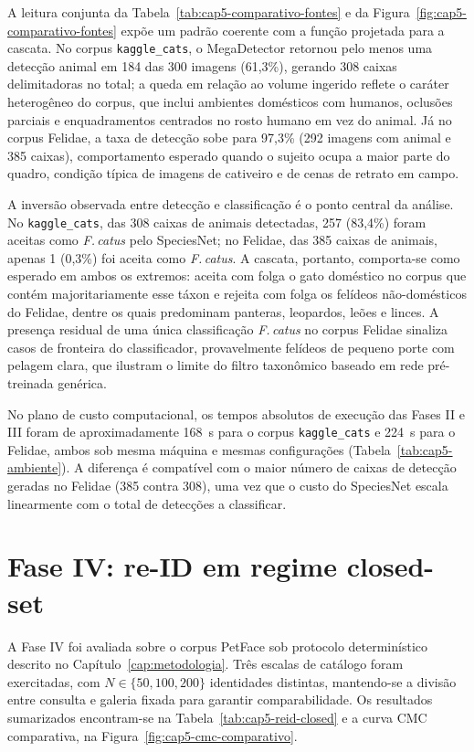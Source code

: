 A leitura conjunta da Tabela~\ref{tab:cap5-comparativo-fontes} e da Figura~\ref{fig:cap5-comparativo-fontes} expõe um padrão coerente com a função projetada para a cascata. No corpus \texttt{kaggle\_cats}, o MegaDetector retornou pelo menos uma detecção animal em 184 das 300 imagens (61,3\%), gerando 308 caixas delimitadoras no total; a queda em relação ao volume ingerido reflete o caráter heterogêneo do corpus, que inclui ambientes domésticos com humanos, oclusões parciais e enquadramentos centrados no rosto humano em vez do animal. Já no corpus Felidae, a taxa de detecção sobe para 97,3\% (292 imagens com animal e 385 caixas), comportamento esperado quando o sujeito ocupa a maior parte do quadro, condição típica de imagens de cativeiro e de cenas de retrato em campo.

A inversão observada entre detecção e classificação é o ponto central da análise. No \texttt{kaggle\_cats}, das 308 caixas de animais detectadas, 257 (83,4\%) foram aceitas como \textit{F.\,catus} pelo SpeciesNet; no Felidae, das 385 caixas de animais, apenas 1 (0,3\%) foi aceita como \textit{F.\,catus}. A cascata, portanto, comporta-se como esperado em ambos os extremos: aceita com folga o gato doméstico no corpus que contém majoritariamente esse táxon e rejeita com folga os felídeos não-domésticos do Felidae, dentre os quais predominam panteras, leopardos, leões e linces. A presença residual de uma única classificação \textit{F.\,catus} no corpus Felidae sinaliza casos de fronteira do classificador, provavelmente felídeos de pequeno porte com pelagem clara, que ilustram o limite do filtro taxonômico baseado em rede pré-treinada genérica.

No plano de custo computacional, os tempos absolutos de execução das Fases II e III foram de aproximadamente 168~s para o corpus \texttt{kaggle\_cats} e 224~s para o Felidae, ambos sob mesma máquina e mesmas configurações (Tabela~\ref{tab:cap5-ambiente}). A diferença é compatível com o maior número de caixas de detecção geradas no Felidae (385 contra 308), uma vez que o custo do SpeciesNet escala linearmente com o total de detecções a classificar.

\section{Fase IV: re-ID em regime closed-set}
\label{sec:res-reid-closed}

A Fase IV foi avaliada sobre o corpus PetFace \cite{petface_dataset} sob protocolo determinístico descrito no Capítulo~\ref{cap:metodologia}. Três escalas de catálogo foram exercitadas, com $N \in \{50, 100, 200\}$ identidades distintas, mantendo-se a divisão entre consulta e galeria fixada para garantir comparabilidade. Os resultados sumarizados encontram-se na Tabela~\ref{tab:cap5-reid-closed} e a curva CMC comparativa, na Figura~\ref{fig:cap5-cmc-comparativo}.

